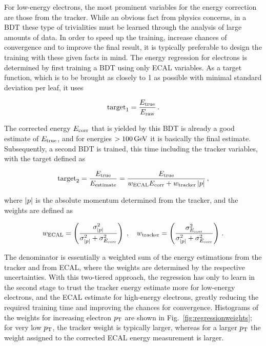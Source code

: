 For low-energy electrons, the most prominent variables for the energy correction are those from the tracker.
% 
While an obvious fact from physics concerns, in a BDT these type of trivialities must be learned through the analysis of large amounts of data.
% 
In order to speed up the training, increase chances of convergence and to improve the final result, it is typically preferable to design the training with these given facts in mind.
% 
The energy regression for electrons is determined by first training a BDT using only ECAL variables.
%
As a target function, which is to be brought as closely to 1 as possible with minimal standard deviation per leaf, it uses
% 
\begin{linenomath*}
\begin{equation}
\text{target}_1 = \frac{E_\text{true}}{E_\text{raw}}
\,.
\end{equation}
\end{linenomath*}
% 
The corrected energy $E_\text{corr}$ that is yielded by this BDT is already a good estimate of $E_\text{true}$, and for energies $>100\,\text{GeV}$ it is basically the final estimate.
% 
Subsequently, a second BDT is trained, this time including the tracker variables, with the target defined as
% 
\begin{linenomath*}
\begin{equation}
\text{target}_2 = 
% 
\frac{\Etrue}{E_\text{estimate}} =
% 
\frac{\Etrue}{ w_\text{ECAL} \Ecorr + w_\text{tracker} \abs{p} }
\,,
\end{equation}
\end{linenomath*}
% 
where $\left| p \right |$ is the absolute momentum determined from the tracker, and the weights are defined as
% 
\begin{linenomath*}
\begin{equation}
w_\text{ECAL} = \left( \frac{\sigma^2_{\left| p \right |}}{\sigma^2_{\left| p \right |} + \sigma^2_{E_\text{corr}}} \right)
\;,\quad
w_\text{tracker} = \left( \frac{\sigma^2_{E_\text{corr}}}{\sigma^2_{\left| p \right |} + \sigma^2_{E_\text{corr}}} \right)
\,.
\end{equation}
\end{linenomath*}
% 
The denominator is essentially a weighted sum of the energy estimations from the tracker and from ECAL, where the weights are determined by the respective uncertainties.
% 
With this two-tiered approach, the regression has only to learn in the second stage to trust the tracker energy estimate more for low-energy electrons, and the ECAL estimate for high-energy electrons, greatly reducing the required training time and improving the chances for convergence.
% 
Histograms of the weights for increasing electron $p_\mathrm{T}$ are shown in Fig.~\ref{fig:regressionweights}; for very low $p_\mathrm{T}$, the tracker weight is typically larger, whereas for a larger $p_\mathrm{T}$ the weight assigned to the corrected ECAL energy measurement is larger.


